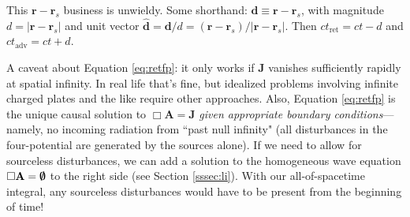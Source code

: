 \documentclass[12pt]{article}
\renewcommand{\vv}[1]{\mathbf{#1}}
\begin{document}
This $\vv r - \vv r_{s}$ business is unwieldy. Some shorthand: $\vv d \equiv \vv r - \vv r_{s}$, with magnitude $d = \vert \vv r - \vv r_{s} \vert$ and unit vector $\vv{\hat{d}} = \vv d / d = (\vv r - \vv r_{s}) / \vert \vv r - \vv r_{s} \vert$. Then $ct_{\textrm{ret}} = ct - d$ and $ct_{\textrm{adv}} = ct + d$.

A caveat about Equation \ref{eq:retfp}: it only works if $\vv J$ vanishes sufficiently rapidly at spatial infinity. In real life that's fine, but idealized problems involving infinite charged plates and the like require other approaches. Also, Equation \ref{eq:retfp} is the unique causal solution to $\Box \vv A = \vv J$ \emph{given appropriate boundary conditions}---namely, no incoming radiation from ``past null infinity" (all disturbances in the four-potential are generated by the sources alone). If we need to allow for sourceless disturbances, we can add a solution to the homogeneous wave equation $\Box \vv A = \textrm{\mbox{\boldmath$\emptyset$}}$ to the right side (see Section \ref{sssec:li}). With our all-of-spacetime integral, any sourceless disturbances would have to be present from the beginning of time!
\end{document}
